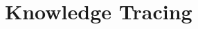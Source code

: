 \documentclass{beamer}
\theoremstyle{definition}
\begin{document}
\section{Knowledge Tracing}

\end{document}
